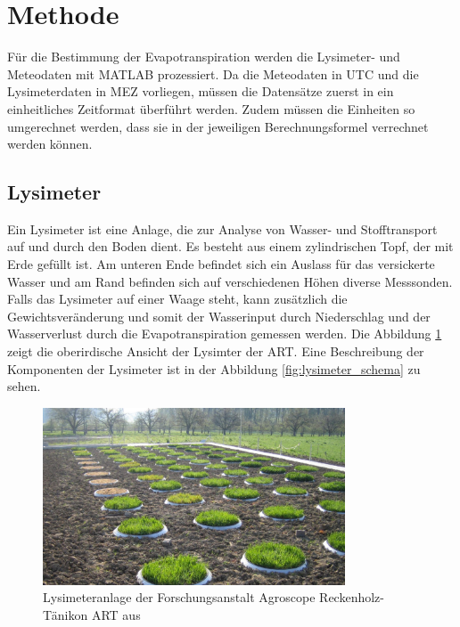 \section{Methode}
Für die Bestimmung der Evapotranspiration werden die Lysimeter- und Meteodaten mit MATLAB prozessiert. Da die Meteodaten in UTC und die Lysimeterdaten in MEZ vorliegen, müssen die Datensätze zuerst in ein einheitliches Zeitformat überführt werden. Zudem müssen die Einheiten so umgerechnet werden, dass sie in der jeweiligen Berechnungsformel verrechnet werden können. 

\subsection {Lysimeter}

Ein Lysimeter ist eine Anlage, die zur Analyse von Wasser- und Stofftransport auf und durch den Boden dient. Es besteht aus einem zylindrischen Topf, der mit Erde gefüllt ist. Am unteren Ende befindet sich ein Auslass für das versickerte Wasser und am Rand befinden sich auf verschiedenen Höhen diverse Messsonden. Falls das Lysimeter auf einer Waage steht, kann zusätzlich die Gewichtsveränderung und somit der Wasserinput durch Niederschlag und der Wasserverlust durch die Evapotranspiration gemessen werden. Die Abbildung \ref{fig:lysimeter_ART}  zeigt die oberirdische Ansicht der Lysimter der ART. Eine Beschreibung der Komponenten der Lysimeter ist in der Abbildung \ref{fig:lysimeter_schema} zu sehen.\\

\begin{figure}[H]
\centering
\includegraphics[width=0.8\textwidth]{figures/lysimeter_ART.jpg}
\caption{Lysimeteranlage der Forschungsanstalt Agroscope Reckenholz-Tänikon ART aus \cite{art}}
\label{fig:lysimeter_ART}
\end{figure}
 
